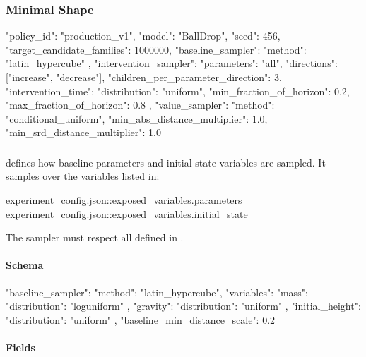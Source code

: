 \documentclass[11pt]{article}
\begin{document}
\subsubsection*{Minimal Shape}

\begin{DocCode}
{
  "policy_id": "production_v1",
  "model": "BallDrop",
  "seed": 456,
  "target_candidate_families": 1000000,
  "baseline_sampler": {
    "method": "latin_hypercube"
  },
  "intervention_sampler": {
    "parameters": "all",
    "directions": ["increase", "decrease"],
    "children_per_parameter_direction": 3,
    "intervention_time": {
      "distribution": "uniform",
      "min_fraction_of_horizon": 0.2,
      "max_fraction_of_horizon": 0.8
    },
    "value_sampler": {
      "method": "conditional_uniform",
      "min_abs_distance_multiplier": 1.0,
      "min_srd_distance_multiplier": 1.0
    }
  }
}
\end{DocCode}

\subsubsection*{\texorpdfstring{}{baseline\_sampler}}

 defines how baseline parameters and initial-state variables are sampled.
It samples over the variables listed in:

\begin{DocCode}
experiment_config.json::exposed_variables.parameters
experiment_config.json::exposed_variables.initial_state
\end{DocCode}

The sampler must respect all  defined in .

\paragraph{Schema}

\begin{DocCode}
"baseline_sampler": {
  "method": "latin_hypercube",
  "variables": {
    "mass": {
      "distribution": "loguniform"
    },
    "gravity": {
      "distribution": "uniform"
    },
    "initial_height": {
      "distribution": "uniform"
    }
  },
  "baseline_min_distance_scale": 0.2
}
\end{DocCode}

\paragraph{Fields}
\end{document}
